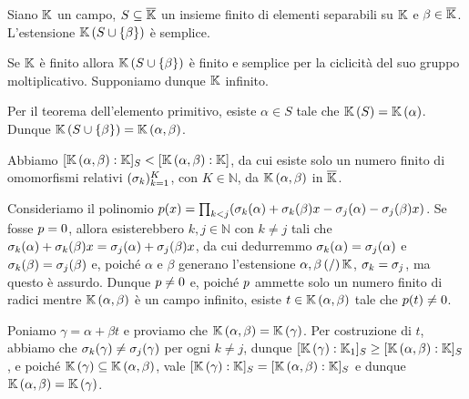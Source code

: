 \begin{Theorem}
	Siano $\mathbb{K}$ un campo, $S \subseteq \overline{\mathbb{K}}$ un insieme finito di elementi separabili su $\mathbb{K}$ e $\beta \in \overline{\mathbb{K}}$. L'estensione $\mathbb{K} \left ( S \cup \lbrace \beta \rbrace \right )$ \`e semplice.
\end{Theorem}
\Proof Se $\mathbb{K}$ \`e finito allora $\mathbb{K} \left ( S \cup \lbrace \beta \rbrace \right )$ \`e finito e semplice per la ciclicit\`a del suo gruppo moltiplicativo. Supponiamo dunque $\mathbb{K}$ infinito.
\par Per il teorema dell'elemento primitivo, esiste $\alpha \in S$ tale che $\mathbb{K} \left ( S \right ) = \mathbb{K} \left ( \alpha \right )$. Dunque $\mathbb{K} \left ( S \cup \lbrace \beta \rbrace \right ) = \mathbb{K} \left ( \alpha,\beta \right )$.
\par Abbiamo $[\mathbb{K} \left ( \alpha,\beta \right ):\mathbb{K}]_S < [\mathbb{K} \left ( \alpha,\beta \right ):\mathbb{K}]$, da cui esiste solo un numero finito di omomorfismi relativi $(\sigma_k)_{k = 1}^K$, con $K \in \mathbb{N}$, da $\mathbb{K} \left ( \alpha,\beta \right )$ in $\overline{\mathbb{K}}$.
\par Consideriamo il polinomio $p(x) = \prod_{k < j} (\sigma_k(\alpha) + \sigma_k(\beta)x - \sigma_j(\alpha) - \sigma_j(\beta)x)$. Se fosse $p = 0$, allora esisterebbero $k, j \in \mathbb{N}$ con $k \neq j$ tali che $\sigma_k(\alpha) + \sigma_k(\beta)x = \sigma_j(\alpha) + \sigma_j(\beta)x$, da cui dedurremmo $\sigma_k(\alpha) = \sigma_j(\alpha)$ e $\sigma_k(\beta) = \sigma_j(\beta)$ e, poich\'e $\alpha$ e $\beta$ generano l'estensione $\alpha,\beta \left ( / \right )\mathbb{K}$, $\sigma_k = \sigma_j$, ma questo \`e assurdo. Dunque $p \neq 0$ e, poich\'e $p$ ammette solo un numero finito di radici mentre $\mathbb{K} \left ( \alpha,\beta \right )$ \`e un campo infinito, esiste $t \in \mathbb{K} \left ( \alpha,\beta \right )$ tale che $p(t) \neq 0$.
\par Poniamo $\gamma = \alpha + \beta t$ e proviamo che $\mathbb{K} \left ( \alpha,\beta \right ) = \mathbb{K} \left ( \gamma \right )$. Per costruzione di $t$, abbiamo che $\sigma_k(\gamma) \neq \sigma_j(\gamma)$ per ogni $k \neq j$, dunque $[\mathbb{K} \left ( \gamma \right ):\mathbb{K}_1]_S \geq [\mathbb{K} \left ( \alpha,\beta \right ):\mathbb{K}]_S$, e poich\'e $\mathbb{K} \left ( \gamma \right ) \subseteq \mathbb{K} \left ( \alpha,\beta \right )$, vale $[\mathbb{K} \left ( \gamma \right ):\mathbb{K}]_S = [\mathbb{K} \left ( \alpha,\beta \right ):\mathbb{K}]_S$ e dunque $\mathbb{K} \left ( \alpha,\beta \right ) = \mathbb{K} \left ( \gamma \right )$. \EndProof
